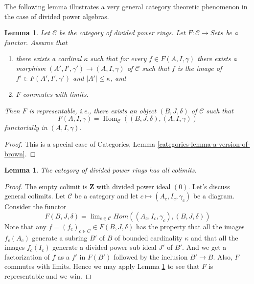 \documentclass{stacks-project}
\theoremstyle{plain}
\newtheorem{lemma}[subsection]{Lemma}
\theoremstyle{definition}
\theoremstyle{remark}
\numberwithin{equation}{subsection}
\def\lim{\mathop{\mathrm{lim}}\nolimits}
\def\Hom{\mathop{\mathrm{Hom}}\nolimits}
\begin{document}
\noindent
The following lemma illustrates a very general category theoretic
phenomenon in the case of divided power algebras.

\begin{lemma}
\label{lemma-a-version-of-brown}
Let $\mathcal{C}$ be the category of divided power rings. Let
$F : \mathcal{C} \to \textit{Sets}$ be a functor.
Assume that
\begin{enumerate}
\item there exists a cardinal $\kappa$ such that for every
$f \in F(A, I, \gamma)$ there exists a morphism
$(A', I', \gamma') \to (A, I, \gamma)$ of $\mathcal{C}$ such that $f$
is the image of $f' \in F(A', I', \gamma')$ and $|A'| \leq \kappa$, and
\item $F$ commutes with limits.
\end{enumerate}
Then $F$ is representable, i.e., there exists an object $(B, J, \delta)$
of $\mathcal{C}$ such that
$$
F(A, I, \gamma) = \Hom_\mathcal{C}((B, J, \delta), (A, I, \gamma))
$$
functorially in $(A, I, \gamma)$.
\end{lemma}

\begin{proof}
This is a special case of
Categories, Lemma \ref{categories-lemma-a-version-of-brown}.
\end{proof}

\begin{lemma}
\label{lemma-colimits}
The category of divided power rings has all colimits.
\end{lemma}

\begin{proof}
The empty colimit is $\mathbf{Z}$ with divided power ideal $(0)$.
Let's discuss general colimits. Let $\mathcal{C}$ be a category and let
$c \mapsto (A_c, I_c, \gamma_c)$ be a diagram. Consider the functor
$$
F(B, J, \delta) = \lim_{c \in \mathcal{C}}
Hom((A_c, I_c, \gamma_c), (B, J, \delta))
$$
Note that any $f = (f_c)_{c \in C} \in F(B, J, \delta)$ has the property
that all the images $f_c(A_c)$ generate a subring $B'$ of $B$ of bounded
cardinality $\kappa$ and that all the images $f_c(I_c)$ generate a
divided power sub ideal $J'$ of $B'$. And we get a factorization of
$f$ as a $f'$ in $F(B')$ followed by the inclusion $B' \to B$. Also,
$F$ commutes with limits. Hence we may apply
Lemma \ref{lemma-a-version-of-brown}
to see that $F$ is representable and we win.
\end{proof}
\end{document}
